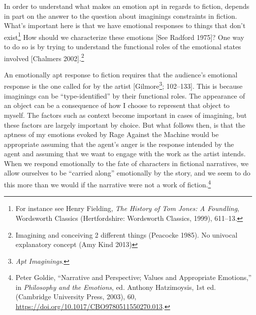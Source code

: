 \documentclass[phdthesis,12pt,final]{wuthesis}
\theoremstyle{definition}
\theoremstyle{definition}
\theoremstyle{definition}
\theoremstyle{definition}
\theoremstyle{remark}
\begin{document}
In order to understand what makes an emotion apt in regards to fiction, depends in part on the answer to the question about imaginings constraints in fiction. What's important here is that we have emotional responses to things that don't exist\footnote{For instance see Henry Fielding, \emph{The {History} of {Tom Jones}: {A} Foundling}, Wordsworth {Classics} (Hertfordshire: Wordsworth Classics, 1999), 611--13.} How should we characterize these emotions {[}See Radford 1975{]}? One way to do so is by trying to understand the functional roles of the emotional states involved {[}Chalmers 2002{]}.\footnote{Imagining and conceiving 2 different things (Peacocke 1985). No univocal explanatory concept (Amy Kind 2013)}

An emotionally apt response to fiction requires that the audience's emotional response is the one called for by the artist {[}Gilmore\footnote{\emph{Apt {Imaginings}}.}; 102--133{]}. This is because imaginings can be ``type-identified'' by their functional roles. The appearance of an object can be a consequence of how I choose to represent that object to myself. The factors such as context become important in cases of imagining, but these factors are largely important by choice. But what follows then, is that the aptness of my emotions evoked by Rage Against the Machine would be appropriate assuming that the agent's anger is the response intended by the agent and assuming that we want to engage with the work as the artist intends. When we respond emotionally to the fate of characters in fictional narratives, we allow ourselves to be ``carried along'' emotionally by the story, and we seem to do this more than we would if the narrative were not a work of fiction.\footnote{Peter Goldie, {``Narrative and {Perspective}; {Values} and {Appropriate Emotions},''} in \emph{Philosophy and the {Emotions}}, ed. Anthony Hatzimoysis, 1st ed. (Cambridge University Press, 2003), 60, \url{https://doi.org/10.1017/CBO9780511550270.013}.}
\end{document}
